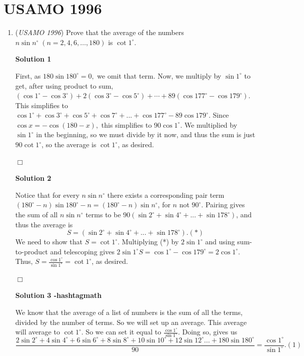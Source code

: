\section{USAMO 1996}
        \begin{enumerate}
        	\item (\textit{USAMO 1996}) Prove that the average of the numbers $n \sin n^{\circ} \; (n = 2,4,6,\ldots,180)$ is $\cot 1^{\circ}$.


 



\textbf{Solution 1}

First, as $180\sin{180^\circ}=0,$ we omit that term. Now, we multiply by $\sin 1^\circ$ to get, after using product to sum, $(\cos 1^\circ-\cos 3^\circ)+2(\cos 3^\circ-\cos 5^\circ)+\cdots +89(\cos 177^\circ-\cos 179^\circ)$. This simplifies to $\cos 1^\circ+\cos 3^\circ +\cos 5^\circ+\cos 7^\circ+...+\cos 177^\circ-89\cos 179^\circ$. Since $\cos x=-\cos(180-x),$ this simplifies to $90\cos 1^\circ$. We multiplied by $\sin 1^\circ$ in the beginning, so we must divide by it now, and thus the sum is just $90\cot 1^\circ$, so the average is $\cot 1^\circ$, as desired.

 $\Box$




\textbf{Solution 2}

Notice that for every $n\sin n^\circ$ there exists a corresponding pair term $(180^\circ - n)\sin{180^\circ - n} = (180^\circ - n)\sin n^\circ$, for $n$ not $90^\circ$. Pairing gives the sum of all $n\sin n^\circ$ terms to be $90(\sin 2^\circ + \sin 4^\circ + ... + \sin 178^\circ)$, and thus the average is 
 \[S = (\sin 2^\circ + \sin 4^\circ + ... + \sin 178^\circ). (*)\] We need to show that $S = \cot 1^\circ$. Multiplying (*) by $2\sin 1^\circ$ and using sum-to-product and telescoping gives $2\sin 1^\circ S = \cos 1^\circ - \cos 179^\circ = 2\cos 1^\circ$. Thus, $S = \frac{\cos 1^\circ}{\sin 1^\circ} = \cot 1^\circ$, as desired.

 $\Box$




\textbf{Solution 3 -hashtagmath}

We know that the average of a list of numbers is the sum of all the terms, divided by the number of terms. So we will set up an average. This average will average to $\cot 1^\circ$. So we can set it equal to $\frac{\cos 1^\circ}{\sin 1^\circ}$. Doing so, gives us 
 \[\frac{2 \sin 2^\circ + 4 \sin 4^\circ + 6 \sin 6^\circ + 8 \sin 8^\circ + 10 \sin 10^\circ + 12 \sin 12^\circ ... + 180 \sin 180^\circ}{90} = \frac{\cos 1^\circ}{\sin 1^\circ}.(1)\]


\end{enumerate}
